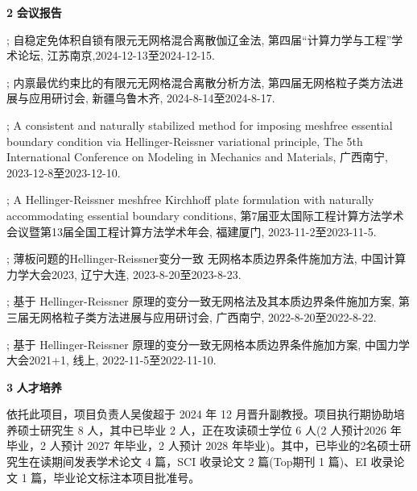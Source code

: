 \noindent\textcircled{\textbf{\small 2}}
\textbf{会议报告}

\begin{enumerate}[label = {[\arabic*]},leftmargin=19pt,itemsep=5pt plus 0.3ex]
	\zhkai\ensong\fontsize{12pt}{22pt}\selectfont%
	\setlength{\baselineskip}{15pt}
    \item \textbf{}; 自稳定免体积自锁有限元无网格混合离散伽辽金法, 第四届“计算力学与工程”学术论坛, 江苏南京,2024-12-13至2024-12-15.
    \item \textbf{}; 内禀最优约束比的有限元无网格混合离散分析方法, 第四届无网格粒子类方法进展与应用研讨会, 新疆乌鲁木齐, 2024-8-14至2024-8-17.
    \item \textbf{}; A consistent and naturally stabilized method for imposing meshfree essential boundary condition via Hellinger-Reissner variational principle, The 5th International Conference on Modeling in Mechanics and Materials, 广西南宁, 2023-12-8至2023-12-10.
    \item \textbf{}; A Hellinger-Reissner meshfree Kirchhoff plate formulation with naturally accommodating essential boundary conditions, 第7届亚太国际工程计算方法学术会议暨第13届全国工程计算方法学术年会, 福建厦门, 2023-11-2至2023-11-5.
    \item \textbf{}; 薄板问题的Hellinger-Reissner变分一致 无网格本质边界条件施加方法, 中国计算力学大会2023, 辽宁大连, 2023-8-20至2023-8-23.
    \item \textbf{}; 基于 Hellinger-Reissner 原理的变分一致无网格法及其本质边界条件施加方案, 第三届无网格粒子类方法进展与应用研讨会, 广西南宁, 2022-8-20至2022-8-22.
    \item \textbf{}; 基于 Hellinger-Reissner 原理的变分一致无网格本质边界条件施加方案, 中国力学大会2021+1, 线上, 2022-11-5至2022-11-10.
\end{enumerate}

\noindent\textcircled{\textbf{\small 3}}
\textbf{人才培养}

依托此项目，项目负责人吴俊超于 2024 年 12 月晋升副教授。项目执行期协助培养硕士研究生 8 人，其中已毕业 2 人，正在攻读硕士学位 6 人(2 人预计2026 年毕业，2 人预计 2027 年毕业，2 人预计 2028 年毕业)。其中，已毕业的2名硕士研究生在读期间发表学术论文 4 篇，SCI 收录论文 2 篇(Top期刊 1 篇)、EI 收录论文 1 篇，毕业论文标注本项目批准号。


